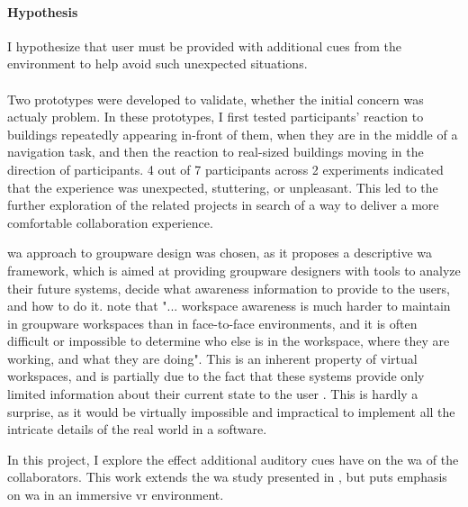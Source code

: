 \paragraph{Hypothesis} I hypothesize that user must be provided with additional cues from the environment to help avoid such unexpected situations. 
 
\paragraph{}
Two prototypes were developed to validate, whether the initial concern was actualy problem. In these prototypes, I first tested participants' reaction to buildings repeatedly appearing in-front of them, when they are in the middle of a navigation task, and then the reaction to real-sized buildings moving in the direction of participants. 4 out of 7 participants across 2 experiments indicated that the experience was unexpected, stuttering, or unpleasant. This led to the further exploration of the related projects in search of a way to deliver a more comfortable collaboration experience.

\gls{wa} approach to groupware design was chosen, as it proposes a descriptive \gls{wa} framework, which is aimed at providing groupware designers with tools to analyze their future systems, decide what awareness information to provide to the users, and how to do it. \cite{gutwin_descriptive_2002} note that "... workspace awareness is much harder to maintain in groupware workspaces than in face-to-face environments, and it is often difficult or impossible to determine who else is in the workspace, where they are working, and what they are doing". This is an inherent property of virtual workspaces, and is partially due to the fact that these systems provide only limited information about their current state to the user \cite[p.~414-415]{gutwin_descriptive_2002}. This is hardly a surprise, as it would be virtually impossible and impractical to implement all the intricate details of the real world in a software. 

In this project, I explore the effect additional auditory cues have on the \gls{wa} of the collaborators. This work extends the \gls{wa} study presented in \cite{gutwin_chalk_2011}, but puts emphasis on \gls{wa} in an immersive \gls{vr} environment.

